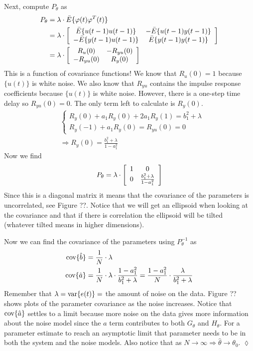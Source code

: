 \begin{example}
Next, compute $P_\theta$ as
\begin{align*}
P_\theta &= \lambda\cdot \bar{E}\{\varphi(t)\varphi^T(t)\} \\
&= \lambda\cdot \left[\begin{array}{c c}
\bar{E}\{u(t-1)u(t-1)\} & -\bar{E}\{u(t-1)y(t-1)\} \\
-\bar{E}\{y(t-1)u(t-1)\} & \bar{E}\{y(t-1)y(t-1)\}
\end{array}\right] \\
&= \lambda\cdot \left[\begin{array}{c c}
R_u(0) & -R_{yu}(0) \\ -R_{yu}(0) & R_y(0)
\end{array}\right]
\end{align*}
This is a function of covariance functions! We know that $R_u(0)=1$ because $\{u(t)\}$ is white noise. We also know that $R_{yu}$ contains the impulse response coefficients because $\{u(t)\}$ is white noise. However, there is a one-step time delay so $R_{yu}(0) = 0$. The only term left to calculate is $R_y(0)$.
\begin{align*}
&\begin{cases} R_y(0) + a_1R_y(0)+2a_1R_y(1) = b_1^2+\lambda \\ R_y(-1)+a_1R_y(0) = R_{yu}(0) = 0 \end{cases} \\
&\Rightarrow R_y(0) = \frac{b_1^2+\lambda}{1-a_1^2}
\end{align*}
Now we find
$$P_\theta = \lambda\cdot \left[\begin{array}{c c} 1 & 0 \\ 0 & \frac{b_1^2+\lambda}{1-a_1^2} \end{array}\right]$$
Since this is a diagonal matrix it means that the covariance of the parameters is uncorrelated, see Figure ??. Notice that we will get an ellipsoid when looking at the covariance and that if there is correlation the ellipsoid will be tilted (whatever tilted means in higher dimensions).

Now we can find the covariance of the parameters using $P_\theta^{-1}$ as
\begin{align*}
\text{cov}\{\hat{b}\} &= \frac{1}{N}\cdot\lambda \\
\text{cov}\{\hat{a}\} &= \frac{1}{N}\cdot\lambda\cdot\frac{1-a_1^2}{b_1^2+\lambda} = \frac{1-a_1^2}{N}\cdot\frac{\lambda}{b_1^2+\lambda}
\end{align*}
Remember that $\lambda = \text{var}\{e(t)\} = $ the amount of noise on the data. Figure ?? shows plots of the parameter covariance as the noise increases. Notice that $\text{cov}\{\hat{a}\}$ settles to a limit because more noise on the data gives more information about the noise model since the $a$ term contributes to both $G_\theta$ and $H_\theta$. For a parameter estimate to reach an asymptotic limit that parameter needs to be in both the system and the noise models. Also notice that as $N\to\infty \Rightarrow \hat{\theta}\to\theta_0$.
$\lozenge$
\end{example}

